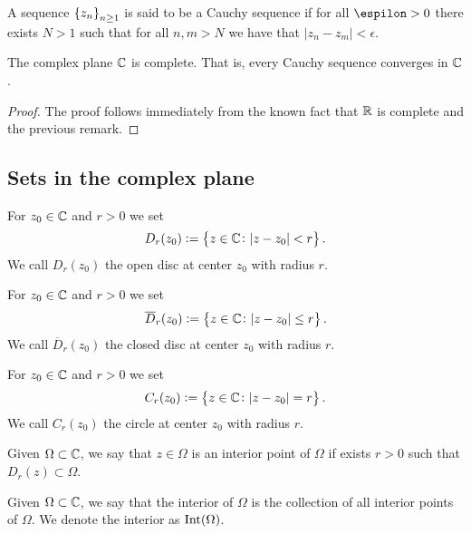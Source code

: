 \documentclass[11pt,a4paper]{article}
\begin{document}
\begin{definition}
    A sequence $\set{z_n}_{n \geq 1}$ is said to be a Cauchy sequence if for
    all $\espilon > 0$ there exists $N > 1$ such that for all $n,m > N$
    we have that $|z_n - z_m| < \epsilon$.
\end{definition}

\begin{proposition}
    The complex plane $\mathbb{C}$ is complete.
    That is, every Cauchy sequence converges in $\mathbb{C}$.
\end{proposition}
\begin{proof}
    The proof follows immediately from the known fact that $\mathbb{R}$ is complete
    and the previous remark.
\end{proof}

\subsection{Sets in the complex plane}

\begin{definition}
    For $z_0 \in \mathbb{C}$ and $r > 0$ we set
    \[
        D_r(z_0) := \set{z \in \mathbb{C}\colon |z - z_0| < r}.
    \]
    We call $D_r(z_0)$ the open disc at center $z_0$ with radius $r$.
\end{definition}


\begin{definition}
    For $z_0 \in \mathbb{C}$ and $r > 0$ we set
    \[
        \overline D_r(z_0) := \set{z \in \mathbb{C}\colon |z - z_0| \le r}.
    \]
    We call $\overline D_r(z_0)$ the closed disc at center $z_0$ with
    radius $r$.
\end{definition}

\begin{definition}[Circle]
    For $z_0 \in \mathbb{C}$ and $r > 0$ we set
    \[
        C_r(z_0) := \set{z \in \mathbb{C}\colon |z - z_0| = r}.
    \]
    We call $C_r(z_0)$ the circle at center $z_0$ with radius $r$.
\end{definition}

\begin{definition}
    Given $\Omega \subset \mathbb{C}$, we say that $z \in \Omega$ is an interior
    point of $\Omega$ if exists $r > 0$ such that $D_r(z) \subset \Omega$.
\end{definition}

\begin{definition}
    Given $\Omega \subset \mathbb{C}$, we say that the interior of $\Omega$ is
    the collection of all interior points of $\Omega$.
    We denote the interior as $\operatorname{Int}(\Omega)$.
\end{definition}
\end{document}
